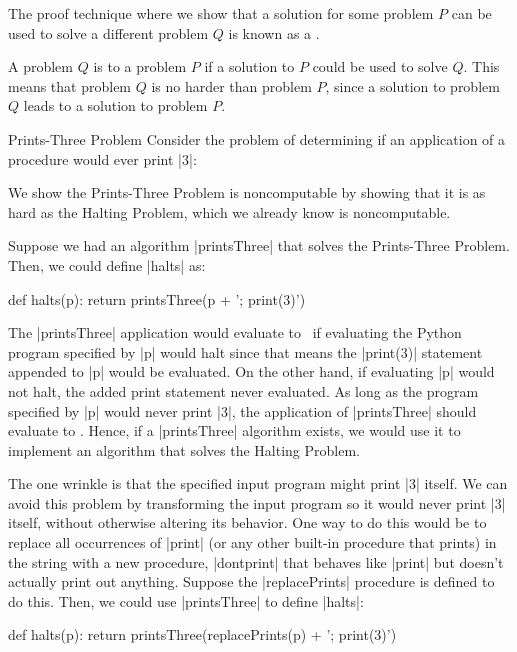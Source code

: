 \begin{schemeregion}
  The proof technique where we show that a solution for some problem $P$ can be used to solve a different problem $Q$ is known as a .  

A problem $Q$ is  to a problem $P$ if a solution to $P$ could be used to solve $Q$.  This means that problem $Q$ is no harder than problem $P$, since a solution to problem $Q$ leads to a solution to problem $P$.  

\begin{examplenobar}{Prints-Three Problem}  Consider the problem of determining if an application of a procedure would ever print \pycode|3|:


We show the Prints-Three Problem is noncomputable by showing that it is as hard as the Halting Problem, which we already know is noncomputable.  

Suppose we had an algorithm \pycode|printsThree| that solves the Prints-Three Problem.  Then, we could define \pycode|halts| as:
\begin{pythoncode}
def halts(p): 
   return printsThree(p +  '; print(3)')
\end{pythoncode}
The \pycode|printsThree| application would evaluate to \True\ if evaluating the Python program specified by \pycode|p| would halt since that means the \pycode|print(3)| statement appended to \pycode|p| would be evaluated.  On the other hand, if evaluating \pycode|p| would not halt, the added print statement never evaluated.  As long as the program specified by \pycode|p| would never print \pycode|3|, the application of \pycode|printsThree| should evaluate to \False.  Hence, if a \pycode|printsThree| algorithm exists, we would use it to implement an algorithm that solves the Halting Problem.

The one wrinkle is that the specified input program might print \pycode|3| itself.  We can avoid this problem by transforming the input program so it would never print \pycode|3| itself, without otherwise altering its behavior.  One way to do this would be to replace all occurrences of \pycode|print| (or any other built-in procedure that prints) in the string with a new procedure, \pycode|dontprint| that behaves like \pycode|print| but doesn't actually print out anything.  Suppose the \pycode|replacePrints| procedure is defined to do this.  Then, we could use \pycode|printsThree| to define \pycode|halts|:
\begin{pythoncode}
def halts(p): return printsThree(replacePrints(p) +  '; print(3)')
\end{pythoncode}


\end{examplenobar}
\end{schemeregion}
